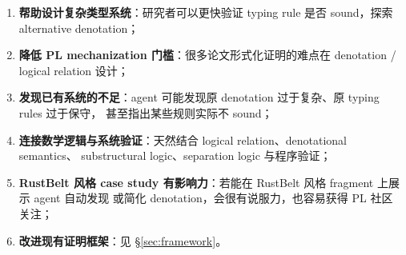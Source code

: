 \begin{enumerate}
  \item \textbf{帮助设计复杂类型系统}：研究者可以更快验证 typing rule 是否 sound，探索 alternative denotation；
  \item \textbf{降低 PL mechanization 门槛}：很多论文形式化证明的难点在 denotation / logical relation 设计；
  \item \textbf{发现已有系统的不足}：agent 可能发现原 denotation 过于复杂、原 typing rules 过于保守，
        甚至指出某些规则实际不 sound；
  \item \textbf{连接数学逻辑与系统验证}：天然结合 logical relation、denotational semantics、
        substructural logic、separation logic 与程序验证；
  \item \textbf{RustBelt 风格 case study 有影响力}：若能在 RustBelt 风格 fragment 上展示 agent 自动发现
        或简化 denotation，会很有说服力，也容易获得 PL 社区关注；
  \item \textbf{改进现有证明框架}：见 \S\ref{sec:framework}。
\end{enumerate}
